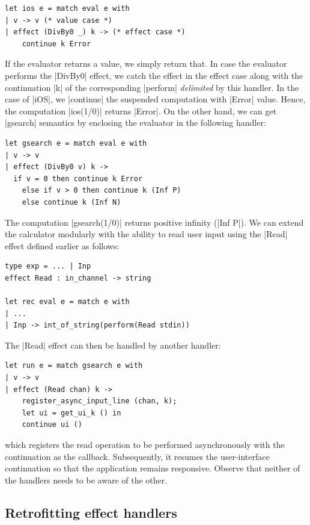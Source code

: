 \documentclass[sigplan,10pt,review,anonymous]{acmart}\settopmatter{printfolios=true,printccs=false,printacmref=false}
\begin{document}
\begin{lstlisting}
let ios e = match eval e with
| v -> v (* value case *)
| effect (DivBy0 _) k -> (* effect case *)
    continue k Error
\end{lstlisting}

If the evaluator returns a value, we simply return that. In case the evaluator
performs the |DivBy0| effect, we catch the effect in the effect case along with
the continuation |k| of the corresponding |perform| \emph{delimited} by this
handler. In the case of |iOS|, we |continue| the suspended computation with
|Error| value. Hence, the computation |ios(1/0)| returns |Error|. On the
other hand, we can get |gsearch| semantics by enclosing the evaluator in the
following handler:

\begin{lstlisting}
let gsearch e = match eval e with
| v -> v
| effect (DivBy0 v) k ->
  if v = 0 then continue k Error
	else if v > 0 then continue k (Inf P)
	else continue k (Inf N)
\end{lstlisting}

The computation |gsearch(1/0)| returns positive infinity (|Inf P|). We can
extend the calculator modularly with the ability to read user input using the
|Read| effect defined earlier as follows:

\begin{lstlisting}
type exp = ... | Inp
effect Read : in_channel -> string

let rec eval e = match e with
| ...
| Inp -> int_of_string(perform(Read stdin))
\end{lstlisting}

The |Read| effect can then be handled by another handler:

\begin{lstlisting}
let run e = match gsearch e with
| v -> v
| effect (Read chan) k ->
	register_async_input_line (chan, k);
	let ui = get_ui_k () in
	continue ui ()
\end{lstlisting}

\noindent which registers the read operation to be performed asynchronously
with the continuation as the callback. Subsequently, it resumes the
user-interface continuation so that the application remains responsive. Observe
that neither of the handlers needs to be aware of the other.

\subsection{Retrofitting effect handlers}
\label{sec:req}
\end{document}
